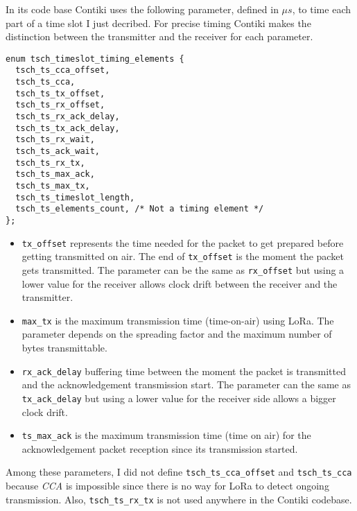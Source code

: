 

In its code base Contiki uses the following parameter, defined in
$\mu s$, to time each part of a time slot I just decribed.
For precise timing Contiki makes the distinction between the transmitter
and the receiver for each parameter.

\begin{lstlisting}
enum tsch_timeslot_timing_elements {
  tsch_ts_cca_offset,
  tsch_ts_cca,
  tsch_ts_tx_offset,
  tsch_ts_rx_offset,
  tsch_ts_rx_ack_delay,
  tsch_ts_tx_ack_delay,
  tsch_ts_rx_wait,
  tsch_ts_ack_wait,
  tsch_ts_rx_tx,
  tsch_ts_max_ack,
  tsch_ts_max_tx,
  tsch_ts_timeslot_length,
  tsch_ts_elements_count, /* Not a timing element */
};
\end{lstlisting}

\begin{itemize}
  \item \lstinline{tx_offset} represents the time needed for the packet to get
    prepared before getting transmitted on air. The end of
    \lstinline{tx_offset} is the moment the packet gets transmitted.
    The parameter can be the same as \lstinline{rx_offset} but using a lower value
    for the receiver allows clock drift between the receiver and the transmitter.
  \item \lstinline{max_tx} is the maximum transmission time (time-on-air) using
    LoRa. The parameter depends on the spreading factor and the maximum number
    of bytes transmittable.
  \item \lstinline{rx_ack_delay} buffering time between the moment the packet
    is transmitted and the acknowledgement transmission start.
    The parameter can the same as \lstinline{tx_ack_delay} but using a lower value
    for the receiver side allows a bigger clock drift.
  \item \lstinline{ts_max_ack} is the maximum transmission time (time on air) for
    the acknowledgement packet reception since its transmission started.
\end{itemize}

Among these parameters, I did not define \lstinline{tsch_ts_cca_offset} and
\lstinline{tsch_ts_cca} because \emph{CCA} is impossible since there is no way
for LoRa to detect ongoing transmission.
Also, \lstinline{tsch_ts_rx_tx} is not used anywhere in the Contiki codebase.

\paragraph{}

